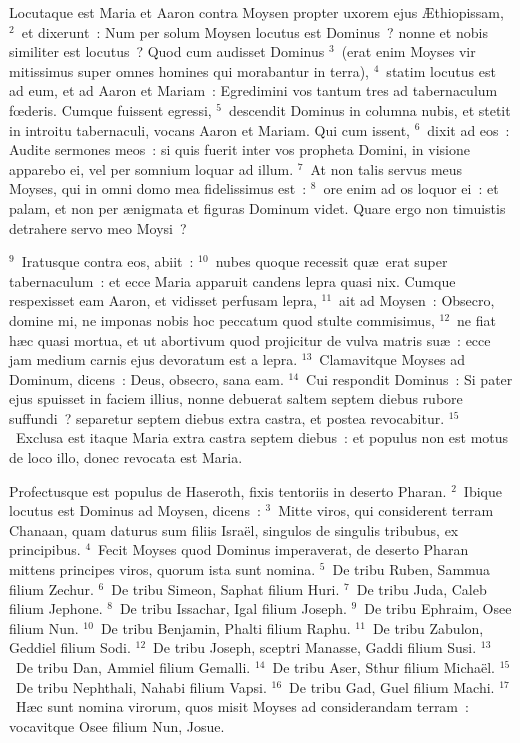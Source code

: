 \lettrine[lines=3,image=true,loversize=0.05,lraise=-0.03]{L}{}ocutaque est Maria et Aaron contra Moysen propter uxorem ejus \AE thiopissam,
${}^{2}$~et dixerunt~: Num per solum Moysen locutus est Dominus~? nonne et nobis similiter est locutus~? Quod cum audisset Dominus
${}^{3}$~(erat enim Moyses vir mitissimus super omnes homines qui morabantur in terra),
${}^{4}$~statim locutus est ad eum, et ad Aaron et Mariam~: Egredimini vos tantum tres ad tabernaculum fœderis. Cumque fuissent egressi,
${}^{5}$~descendit Dominus in columna nubis, et stetit in introitu tabernaculi, vocans Aaron et Mariam. Qui cum issent,
${}^{6}$~dixit ad eos~: Audite sermones meos~: si quis fuerit inter vos propheta Domini, in visione apparebo ei, vel per somnium loquar ad illum.
${}^{7}$~At non talis servus meus Moyses, qui in omni domo mea fidelissimus est~:
${}^{8}$~ore enim ad os loquor ei~: et palam, et non per \ae nigmata et figuras Dominum videt. Quare ergo non timuistis detrahere servo meo Moysi~?


${}^{9}$~Iratusque contra eos, abiit~:
${}^{10}$~nubes quoque recessit qu\ae\ erat super tabernaculum~: et ecce Maria apparuit candens lepra quasi nix. Cumque respexisset eam Aaron, et vidisset perfusam lepra,
${}^{11}$~ait ad Moysen~: Obsecro, domine mi, ne imponas nobis hoc peccatum quod stulte commisimus,
${}^{12}$~ne fiat h\ae c quasi mortua, et ut abortivum quod projicitur de vulva matris su\ae~: ecce jam medium carnis ejus devoratum est a lepra.
${}^{13}$~Clamavitque Moyses ad Dominum, dicens~: Deus, obsecro, sana eam.
${}^{14}$~Cui respondit Dominus~: Si pater ejus spuisset in faciem illius, nonne debuerat saltem septem diebus rubore suffundi~? separetur septem diebus extra castra, et postea revocabitur.
${}^{15}$~Exclusa est itaque Maria extra castra septem diebus~: et populus non est motus de loco illo, donec revocata est Maria.

\lettrine[lines=3,image=true,loversize=0.05,lraise=-0.03]{P}{}rofectusque est populus de Haseroth, fixis tentoriis in deserto Pharan.
${}^{2}$~Ibique locutus est Dominus ad Moysen, dicens~:
${}^{3}$~Mitte viros, qui considerent terram Chanaan, quam daturus sum filiis Isra\"el, singulos de singulis tribubus, ex principibus.
${}^{4}$~Fecit Moyses quod Dominus imperaverat, de deserto Pharan mittens principes viros, quorum ista sunt nomina.
${}^{5}$~De tribu Ruben, Sammua filium Zechur.
${}^{6}$~De tribu Simeon, Saphat filium Huri.
${}^{7}$~De tribu Juda, Caleb filium Jephone.
${}^{8}$~De tribu Issachar, Igal filium Joseph.
${}^{9}$~De tribu Ephraim, Osee filium Nun.
${}^{10}$~De tribu Benjamin, Phalti filium Raphu.
${}^{11}$~De tribu Zabulon, Geddiel filium Sodi.
${}^{12}$~De tribu Joseph, sceptri Manasse, Gaddi filium Susi.
${}^{13}$~De tribu Dan, Ammiel filium Gemalli.
${}^{14}$~De tribu Aser, Sthur filium Micha\"el.
${}^{15}$~De tribu Nephthali, Nahabi filium Vapsi.
${}^{16}$~De tribu Gad, Guel filium Machi.
${}^{17}$~H\ae c sunt nomina virorum, quos misit Moyses ad considerandam terram~: vocavitque Osee filium Nun, Josue.



